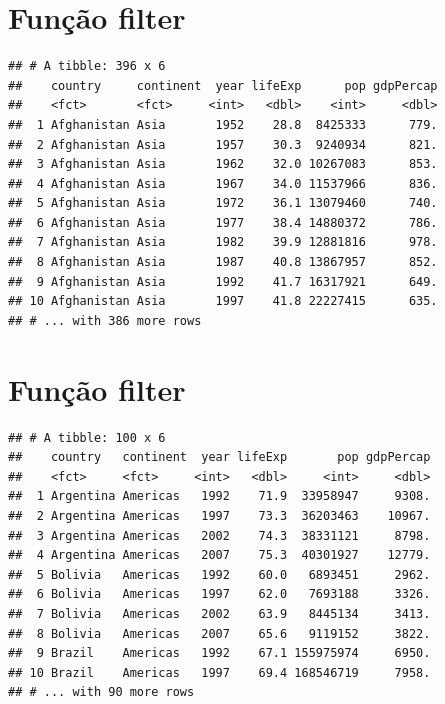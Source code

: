 \documentclass[
]{article}
\newenvironment{Shaded}{\begin{snugshade}}{\end{snugshade}}
\newcommand{\DecValTok}[1]{\textcolor[rgb]{0.00,0.00,0.81}{#1}}
\newcommand{\KeywordTok}[1]{\textcolor[rgb]{0.13,0.29,0.53}{\textbf{#1}}}
\newcommand{\NormalTok}[1]{#1}
\newcommand{\OperatorTok}[1]{\textcolor[rgb]{0.81,0.36,0.00}{\textbf{#1}}}
\newcommand{\StringTok}[1]{\textcolor[rgb]{0.31,0.60,0.02}{#1}}
\begin{document}
\hypertarget{funuxe7uxe3o-filter}{%
\section{Função filter}\label{funuxe7uxe3o-filter}}

\begin{Shaded}
\end{Shaded}

\begin{verbatim}
## # A tibble: 396 x 6
##    country     continent  year lifeExp      pop gdpPercap
##    <fct>       <fct>     <int>   <dbl>    <int>     <dbl>
##  1 Afghanistan Asia       1952    28.8  8425333      779.
##  2 Afghanistan Asia       1957    30.3  9240934      821.
##  3 Afghanistan Asia       1962    32.0 10267083      853.
##  4 Afghanistan Asia       1967    34.0 11537966      836.
##  5 Afghanistan Asia       1972    36.1 13079460      740.
##  6 Afghanistan Asia       1977    38.4 14880372      786.
##  7 Afghanistan Asia       1982    39.9 12881816      978.
##  8 Afghanistan Asia       1987    40.8 13867957      852.
##  9 Afghanistan Asia       1992    41.7 16317921      649.
## 10 Afghanistan Asia       1997    41.8 22227415      635.
## # ... with 386 more rows
\end{verbatim}

\hypertarget{funuxe7uxe3o-filter-1}{%
\section{Função filter}\label{funuxe7uxe3o-filter-1}}

\begin{Shaded}
\end{Shaded}

\begin{verbatim}
## # A tibble: 100 x 6
##    country   continent  year lifeExp       pop gdpPercap
##    <fct>     <fct>     <int>   <dbl>     <int>     <dbl>
##  1 Argentina Americas   1992    71.9  33958947     9308.
##  2 Argentina Americas   1997    73.3  36203463    10967.
##  3 Argentina Americas   2002    74.3  38331121     8798.
##  4 Argentina Americas   2007    75.3  40301927    12779.
##  5 Bolivia   Americas   1992    60.0   6893451     2962.
##  6 Bolivia   Americas   1997    62.0   7693188     3326.
##  7 Bolivia   Americas   2002    63.9   8445134     3413.
##  8 Bolivia   Americas   2007    65.6   9119152     3822.
##  9 Brazil    Americas   1992    67.1 155975974     6950.
## 10 Brazil    Americas   1997    69.4 168546719     7958.
## # ... with 90 more rows
\end{verbatim}
\end{document}
